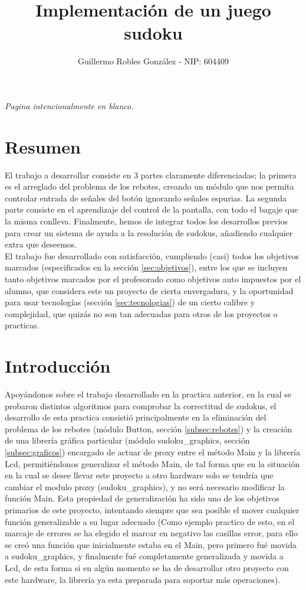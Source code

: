 \documentclass[12pt,letterpaper]{article}
\title{Implementación de un juego sudoku} %
\author{Guillermo Robles González - NIP: 604409}
\newcommand*{\blankpage}[1]{%
\vspace*{\fill}
\begin{center} \textit{#1} \end{center}
\vspace{\fill}
\clearpage}
\begin{document}
\shorthandoff{>}
\shorthandoff{<}
\maketitle
\blankpage{Pagina intencionalmente en blanco.}
\tableofcontents
\clearpage
\section{Resumen}
\label{sec:resumen}
El trabajo a desarrollar consiste en 3 partes claramente
diferenciadas; la primera es el arreglado del problema de los rebotes,
creando un módulo que nos permita controlar entrada de señales del
botón ignorando señales espurias. La segunda parte consiste en el
aprendizaje del control de la pantalla, con todo el bagaje que la
misma conlleva. Finalmente, hemos de integrar todos los desarrollos
previos para crear un sistema de ayuda a la resolución de sudokus,
añadiendo cualquier extra que deseemos.\\

El trabajo fue desarrollado con satisfacción, cumpliendo (casi) todos
los objetivos marcados (especificados en la sección
\ref{sec:objetivos}), entre los que se incluyen tanto objetivos
marcados por el profesorado como objetivos auto impuestos por el
alumno, que considera este un proyecto de cierta envergadura, y la
oportunidad para usar tecnologías (sección \ref{sec:tecnologias}) de
un cierto calibre y complejidad, que quizás no son tan adecuadas para
otros de los proyectos o practicas.

\section{Introducción}
\label{sec:introduccion}
Apoyándonos sobre el trabajo desarrollado en la practica anterior, en
la cual se probaron distintos algoritmos para comprobar la correctitud
de sudokus, el desarrollo de esta practica consistió principalmente en
la eliminación del problema de los rebotes (módulo Button, sección
\ref{subsec:rebotes}) y la creación de una librería gráfica particular
(módulo sudoku\_graphics, sección \ref{subsec:graficos}) encargado de
actuar de proxy entre el método Main y la librería Lcd, permitiéndonos
generalizar el método Main, de tal forma que en la situación en la
cual se desee llevar este proyecto a otro hardware solo se tendría que
cambiar el modulo proxy (sudoku\_graphics), y no será necesario
modificar la función Main. Esta propiedad de generalización ha sido
uno de los objetivos primarios de este proyecto, intentando siempre
que sea posible el mover cualquier función generalizable a su lugar
adecuado (Como ejemplo practico de esto, en el marcaje de errores se
ha elegido el marcar en negativo las casillas error, para ello se creó
una función que inicialmente estaba en el Main, pero primero fué
movida a sudoku\_graphics, y finalmente fué completamente generalizada
y movida a Lcd, de esta forma si en algún momento se ha de desarrollar
otro proyecto con este hardware, la librería ya esta preparada para
soportar más operaciones).
\end{document}

